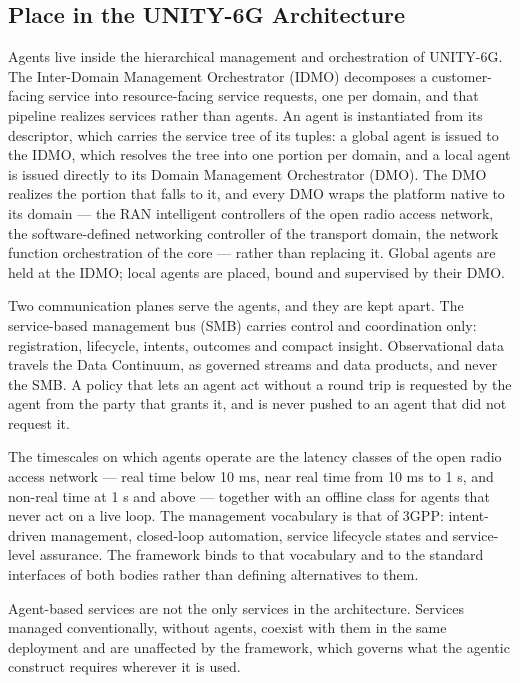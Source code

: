 \hypertarget{place-in-the-unity-6g-architecture}{%
\subsection{Place in the UNITY-6G Architecture}\label{place-in-the-unity-6g-architecture}}

Agents live inside the hierarchical management and orchestration of
UNITY-6G. The Inter-Domain Management Orchestrator (IDMO) decomposes a
customer-facing service into resource-facing service requests, one per
domain, and that pipeline realizes services rather than agents. An agent
is instantiated from its descriptor, which carries the service tree of
its tuples: a global agent is issued to the IDMO, which resolves the
tree into one portion per domain, and a local agent is issued directly
to its Domain Management Orchestrator (DMO). The DMO realizes the
portion that falls to it, and every DMO wraps the platform native to its
domain --- the RAN intelligent controllers of the open radio access
network, the software-defined networking controller of the transport
domain, the network function orchestration of the core --- rather than
replacing it. Global agents are held at the IDMO; local agents are
placed, bound and supervised by their DMO.

Two communication planes serve the agents, and they are kept apart. The
service-based management bus (SMB) carries control and coordination
only: registration, lifecycle, intents, outcomes and compact insight.
Observational data travels the Data Continuum, as governed streams and
data products, and never the SMB. A policy that lets an agent act
without a round trip is requested by the agent from the party that
grants it, and is never pushed to an agent that did not request it.

The timescales on which agents operate are the latency classes of the
open radio access network --- real time below 10 ms, near real time from
10 ms to 1 s, and non-real time at 1 s and above --- together with an
offline class for agents that never act on a live loop. The management
vocabulary is that of 3GPP: intent-driven management, closed-loop
automation, service lifecycle states and service-level assurance. The
framework binds to that vocabulary and to the standard interfaces of
both bodies rather than defining alternatives to them.

Agent-based services are not the only services in the architecture.
Services managed conventionally, without agents, coexist with them in
the same deployment and are unaffected by the framework, which governs
what the agentic construct requires wherever it is used.

